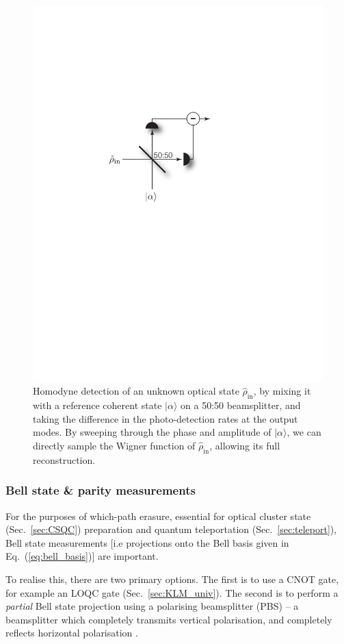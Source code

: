 \documentclass[aps,rmp,twocolumn,amsmath,amssymb,nofootinbib,superscriptaddress,longbibliography,floatfix,table-of-contents,eqsecnum]{revtex4-1}
\newcommand{\ket}[1]{|#1\rangle}
\begin{document}
\begin{figure}[!htb]
\includegraphics[width=0.6\columnwidth]{homodyne}
\caption{Homodyne detection of an unknown optical state $\hat\rho_\text{in}$, by mixing it with a reference coherent state $\ket\alpha$ on a 50:50 beamsplitter, and taking the difference in the photo-detection rates at the output modes. By sweeping through the phase and amplitude of $\ket\alpha$, we can directly sample the Wigner function of $\hat\rho_\text{in}$, allowing its full reconstruction.} \label{fig:homodyne}
\end{figure}


%
%

\subsubsection{Bell state \& parity measurements} \label{sec:bell_proj} 

For the purposes of which-path erasure, essential for optical cluster state (Sec.~\ref{sec:CSQC}) preparation and quantum teleportation (Sec.~\ref{sec:teleport}), Bell state measurements [i.e projections onto the Bell basis given in Eq.~(\ref{eq:bell_basis})] are important.

To realise this, there are two primary options. The first is to use a CNOT gate, for example an LOQC gate (Sec.~\ref{sec:KLM_univ}). The second is to perform a \textit{partial} Bell state projection using a polarising beamsplitter (PBS) -- a beamsplitter which completely transmits vertical polarisation, and completely reflects horizontal polarisation \cite{bib:BraunsteinMann95}.
\end{document}
